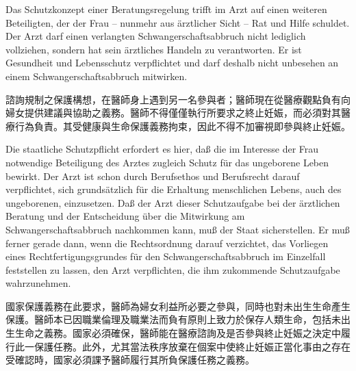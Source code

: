 \documentclass[12pt]{article}
\begin{document}

\begin{sourcepara}[title={原文D.131}]
Das Schutzkonzept einer Beratungsregelung trifft im Arzt auf einen weiteren Beteiligten, der der Frau -- nunmehr aus ärztlicher Sicht -- Rat und Hilfe schuldet. Der Arzt darf einen verlangten Schwangerschaftsabbruch nicht lediglich vollziehen, sondern hat sein ärztliches Handeln zu verantworten. Er ist Gesundheit und Lebensschutz verpflichtet und darf deshalb nicht unbesehen an einem Schwangerschaftsabbruch mitwirken.
\end{sourcepara}
\begin{transpara}
諮詢規制之保護構想，在醫師身上遇到另一名參與者；醫師現在從醫療觀點負有向婦女提供建議與協助之義務。醫師不得僅僅執行所要求之終止妊娠，而必須對其醫療行為負責。其受健康與生命保護義務拘束，因此不得不加審視即參與終止妊娠。
\end{transpara}

\begin{sourcepara}[title={原文D.132}]
Die staatliche Schutzpflicht erfordert es hier, daß die im Interesse der Frau notwendige Beteiligung des Arztes zugleich Schutz für das ungeborene Leben bewirkt. Der Arzt ist schon durch Berufsethos und Berufsrecht darauf verpflichtet, sich grundsätzlich für die Erhaltung menschlichen Lebens, auch des ungeborenen, einzusetzen. Daß der Arzt dieser Schutzaufgabe bei der ärztlichen Beratung und der Entscheidung über die Mitwirkung am Schwangerschaftsabbruch nachkommen kann, muß der Staat sicherstellen. Er muß ferner gerade dann, wenn die Rechtsordnung darauf verzichtet, das Vorliegen eines Rechtfertigungsgrundes für den Schwangerschaftsabbruch im Einzelfall feststellen zu lassen, den Arzt verpflichten, die ihm zukommende Schutzaufgabe wahrzunehmen.
\end{sourcepara}
\begin{transpara}
國家保護義務在此要求，醫師為婦女利益所必要之參與，同時也對未出生生命產生保護。醫師本已因職業倫理及職業法而負有原則上致力於保存人類生命，包括未出生生命之義務。國家必須確保，醫師能在醫療諮詢及是否參與終止妊娠之決定中履行此一保護任務。此外，尤其當法秩序放棄在個案中使終止妊娠正當化事由之存在受確認時，國家必須課予醫師履行其所負保護任務之義務。
\end{transpara}
\end{document}
